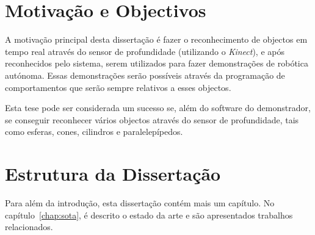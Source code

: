 \section{Motivação e Objectivos} \label{sec:goals}


A motivação principal desta dissertação é fazer o reconhecimento de objectos em tempo 
real através do sensor de profundidade (utilizando o \emph{Kinect}), e após reconhecidos
pelo sistema, serem utilizados para fazer demonstrações de robótica autónoma. Essas
demonstrações serão possíveis através da programação de comportamentos que serão
sempre relativos a esses objectos.

Esta tese pode ser considerada um sucesso se, além do software do demonstrador, se conseguir
reconhecer vários objectos através do sensor de profundidade, tais como esferas, cones, cilindros
e paralelepípedos.


\section{Estrutura da Dissertação} \label{sec:struct}

Para além da introdução, esta dissertação contém mais um capítulo.
No capítulo~\ref{chap:sota}, é descrito o estado da arte e são
apresentados trabalhos relacionados.
